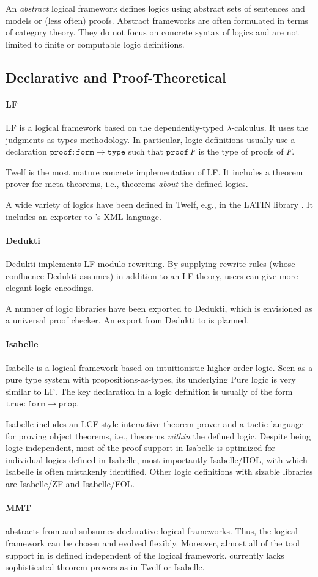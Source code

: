 \documentclass[12pt]{article}
\newcommand{\system}[2][]{\paragraph{#2}#2 \ifnonempty[\cite{#2}]{#1}{\cite{#1}}}
\begin{document}
An \emph{abstract} logical framework defines logics using abstract sets of sentences and models or (less often) proofs.
Abstract frameworks are often formulated in terms of category theory.
They do not focus on concrete syntax of logics and are not limited to finite or computable logic definitions.

\subsection{Declarative and Proof-Theoretical}

\system{LF} is a logical framework based on the dependently-typed $\lambda$-calculus.
It uses the judgments-as-types methodology.
In particular, logic definitions usually use a declaration $\mathtt{proof}:\mathtt{form}\to\mathtt{type}$ such that $\mathtt{proof}\,F$ is the type of proofs of $F$.

Twelf \cite{twelf} is the most mature concrete implementation of LF.
It includes a theorem prover for meta-theorems, i.e., theorems \emph{about} the defined logics.

A wide variety of logics have been defined in Twelf, e.g., in the LATIN library \cite{CHKMR:latinabs:11}.
It includes an exporter to \mmt's XML language.

\system{Dedukti} implements LF modulo rewriting.
By supplying rewrite rules (whose confluence Dedukti assumes) in addition to an LF theory, users can give more elegant logic encodings.

A number of logic libraries have been exported to Dedukti, which is envisioned as a universal proof checker.
An export from Dedukti to \mmt is planned.

\system{Isabelle} is a logical framework based on intuitionistic higher-order logic.
Seen as a pure type system \cite{tps} with propositions-as-types, its underlying Pure logic is very similar to LF.
The key declaration in a logic definition is usually of the form $\mathtt{true}:\mathtt{form}\to\mathtt{prop}$.

Isabelle includes an LCF-style interactive theorem prover and a tactic language for proving object theorems, i.e., theorems \emph{within} the defined logic.
Despite being logic-independent, most of the proof support in Isabelle is optimized for individual logics defined in Isabelle, most importantly Isabelle/HOL, with which Isabelle is often mistakenly identified.
Other logic definitions with sizable libraries are Isabelle/ZF and Isabelle/FOL.

\paragraph{MMT}
\mmt abstracts from and subsumes declarative logical frameworks.
Thus, the logical framework can be chosen and evolved flexibly.
Moreover, almost all of the tool support in \mmt is defined independent of the logical framework.
\mmt currently lacks sophisticated theorem provers as in Twelf or Isabelle.
\end{document}
